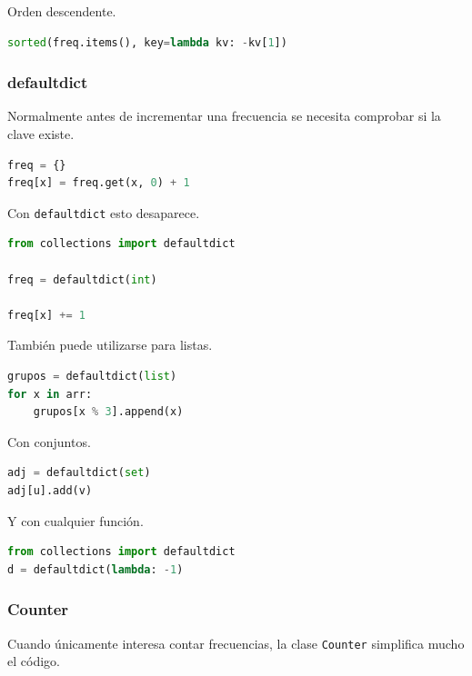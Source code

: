 Orden descendente.

\begin{lstlisting}[language=Python]
sorted(freq.items(), key=lambda kv: -kv[1])
\end{lstlisting}

\vspace{0.3cm}

\subsubsection{defaultdict}

Normalmente antes de incrementar una frecuencia se necesita comprobar si la clave existe.

\begin{lstlisting}[language=Python]
freq = {}
freq[x] = freq.get(x, 0) + 1
\end{lstlisting}

Con \texttt{defaultdict} esto desaparece.

\begin{lstlisting}[language=Python]
from collections import defaultdict

freq = defaultdict(int)

freq[x] += 1
\end{lstlisting}

También puede utilizarse para listas.

\begin{lstlisting}[language=Python]
grupos = defaultdict(list)
for x in arr:
    grupos[x % 3].append(x)
\end{lstlisting}

Con conjuntos.

\begin{lstlisting}[language=Python]
adj = defaultdict(set)
adj[u].add(v)
\end{lstlisting}

Y con cualquier función.

\begin{lstlisting}[language=Python]
from collections import defaultdict
d = defaultdict(lambda: -1)
\end{lstlisting}

\vspace{0.3cm}

\subsubsection{Counter}

Cuando únicamente interesa contar frecuencias, la clase \texttt{Counter} simplifica mucho el código.

